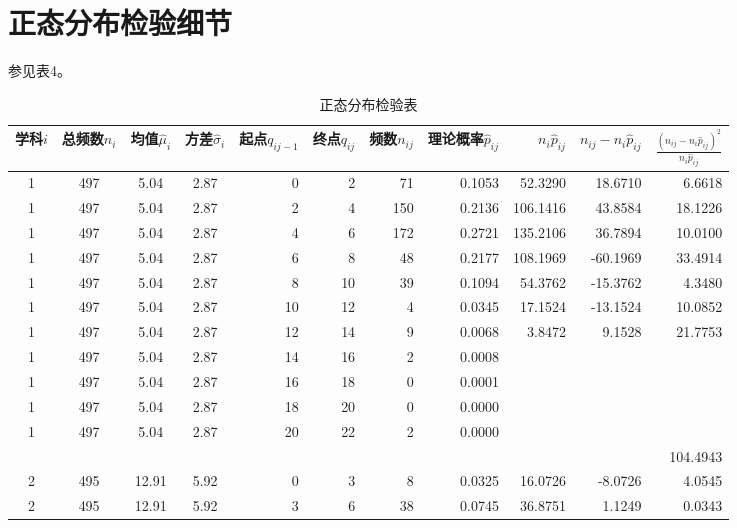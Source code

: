 \documentclass{article}
\begin{document}
\begin{CJK}{UTF8}{song}
\begin{figure}
\begin{multicols}{2}
\end{multicols}
\end{figure}

\section{正态分布检验细节}
参见表4。

\begin{table}[tbp]\scriptsize
\caption{正态分布检验表}
\begin{center}
\begin{threeparttable}[b]
\begin{tabular}{ccccrrrrrrr}

  \toprule
  学科$i$ & 总频数$n_i$ & 均值$\hat{\mu}_i$ & 方差$\hat{\sigma}_i$ & 起点$q_{ij-1}$ & 终点$q_{ij}$ & 频数$n_{ij}$ & 理论概率$\hat{p}_{ij}$ & $n_i \hat{p}_{ij}$ & $n_{ij}-n_i \hat{p}_{ij}$ & $\frac{(n_{ij}-n_i\hat{p}_{ij})^2}{n_i\hat{p}_{ij}}$ \\
  \midrule
  1 & 497 & 5.04 & 2.87 & 0 & 2 & 71 & 0.1053  & 52.3290  & 18.6710  & 6.6618 \\
1 & 497 & 5.04 & 2.87 & 2 & 4 & 150 & 0.2136  & 106.1416  & 43.8584  & 18.1226 \\
1 & 497 & 5.04 & 2.87 & 4 & 6 & 172 & 0.2721  & 135.2106  & 36.7894  & 10.0100 \\
1 & 497 & 5.04 & 2.87 & 6 & 8 & 48 & 0.2177  & 108.1969  & -60.1969  & 33.4914 \\
1 & 497 & 5.04 & 2.87 & 8 & 10 & 39 & 0.1094  & 54.3762  & -15.3762  & 4.3480 \\
1 & 497 & 5.04 & 2.87 & 10 & 12 & 4 & 0.0345  & 17.1524  & -13.1524  & 10.0852 \\
1 & 497 & 5.04 & 2.87 & 12 & 14 & 9 & 0.0068  & 3.8472  & 9.1528  & 21.7753 \\
1 & 497 & 5.04 & 2.87 & 14 & 16 & 2 & 0.0008  &  &  & \\
1 & 497 & 5.04 & 2.87 & 16 & 18 & 0 & 0.0001  &  &  & \\
1 & 497 & 5.04 & 2.87 & 18 & 20 & 0 & 0.0000  &  &  & \\
1 & 497 & 5.04 & 2.87 & 20 & 22 & 2 & 0.0000  &  &  & \\
 &  &  &  &  &  &  &  &  &  & 104.4943 \\
  \midrule
2 & 495 & 12.91 & 5.92 & 0 & 3 & 8 & 0.0325  & 16.0726  & -8.0726  & 4.0545 \\
2 & 495 & 12.91 & 5.92 & 3 & 6 & 38 & 0.0745  & 36.8751  & 1.1249  & 0.0343 \\

\end{tabular}
\end{threeparttable}
\end{center}
\end{table}
\end{CJK}
\end{document}
